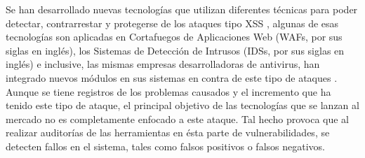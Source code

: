 Se han desarrollado nuevas tecnologías que utilizan diferentes técnicas para poder detectar, contrarrestar y protegerse de los ataques tipo XSS \cite{once}, algunas de esas tecnologías son aplicadas en Cortafuegos de Aplicaciones Web (WAFs, por sus siglas en inglés), los Sistemas de Detección de Intrusos (IDSs, por sus siglas en inglés) e inclusive, las mismas empresas desarrolladoras de antivirus, han integrado nuevos módulos en sus sistemas en contra de este tipo de ataques \cite{doce}.\\

Aunque se tiene registros de los problemas causados y el incremento que ha tenido este tipo de ataque, el principal objetivo de las tecnologías que se lanzan al mercado no es completamente enfocado a este ataque. Tal hecho provoca que al realizar auditorías de las herramientas en ésta parte de vulnerabilidades, se detecten fallos en el sistema, tales como falsos positivos o falsos negativos.\\